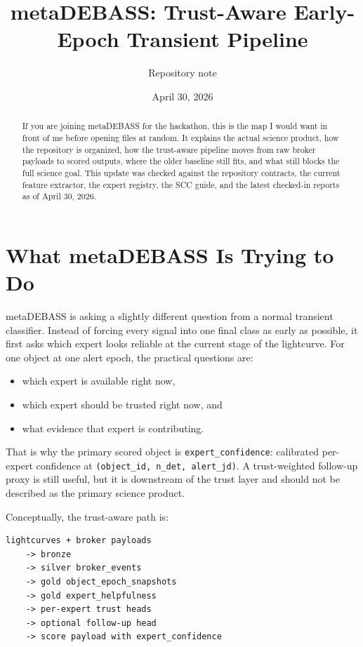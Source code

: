 \documentclass[11pt]{article}
\title{metaDEBASS: Trust-Aware Early-Epoch Transient Pipeline}
\author{Repository note}
\date{April 30, 2026}
\newcommand{\code}[1]{\texttt{#1}}
\begin{document}
\maketitle

\begin{abstract}
If you are joining metaDEBASS for the hackathon, this is the map I would want in front of me before opening files at random. It explains the actual science product, how the repository is organized, how the trust-aware pipeline moves from raw broker payloads to scored outputs, where the older baseline still fits, and what still blocks the full science goal. This update was checked against the repository contracts, the current feature extractor, the expert registry, the SCC guide, and the latest checked-in reports as of April 30, 2026.
\end{abstract}

\tableofcontents

\section{What metaDEBASS Is Trying to Do}

metaDEBASS is asking a slightly different question from a normal transient classifier. Instead of forcing every signal into one final class as early as possible, it first asks which expert looks reliable at the current stage of the lightcurve. For one object at one alert epoch, the practical questions are:

\begin{itemize}
\item which expert is available right now,
\item which expert should be trusted right now, and
\item what evidence that expert is contributing.
\end{itemize}

That is why the primary scored object is \code{expert\_confidence}: calibrated per-expert confidence at \code{(object\_id, n\_det, alert\_jd)}. A trust-weighted follow-up proxy is still useful, but it is downstream of the trust layer and should not be described as the primary science product.

Conceptually, the trust-aware path is:

\begin{verbatim}
lightcurves + broker payloads
    -> bronze
    -> silver broker_events
    -> gold object_epoch_snapshots
    -> gold expert_helpfulness
    -> per-expert trust heads
    -> optional follow-up head
    -> score payload with expert_confidence
\end{verbatim}
\end{document}
